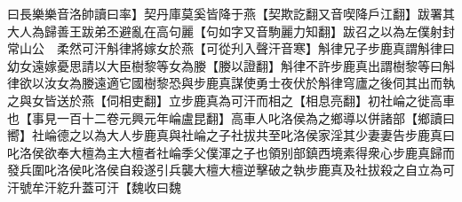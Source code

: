 曰長樂樂音洛帥讀曰率】契丹庫莫奚皆降于燕【契欺訖翻又音喫降戶江翻】跋署其大人為歸善王跋弟丕避亂在高句麗【句如字又音駒麗力知翻】跋召之以為左僕射封常山公　柔然可汗斛律將嫁女於燕【可從刋入聲汗音寒】斛律兄子步鹿真謂斛律曰幼女遠嫁憂思請以大臣樹黎等女為媵【媵以證翻】斛律不許步鹿真出謂樹黎等曰斛律欲以汝女為媵遠適它國樹黎恐與步鹿真謀使勇士夜伏於斛律穹廬之後伺其出而執之與女皆送於燕【伺相吏翻】立步鹿真為可汗而相之【相息亮翻】初社崘之徙高車也【事見一百十二卷元興元年崘盧昆翻】高車人叱洛侯為之鄉導以併諸部【鄉讀曰嚮】社崘德之以為大人步鹿真與社崘之子社拔共至叱洛侯家淫其少妻妻告步鹿真曰叱洛侯欲奉大檀為主大檀者社崘季父僕渾之子也領别部鎮西境素得衆心步鹿真歸而發兵圍叱洛侯叱洛侯自殺遂引兵襲大檀大檀逆擊破之執步鹿真及社拔殺之自立為可汗號牟汗紇升蓋可汗【魏收曰魏